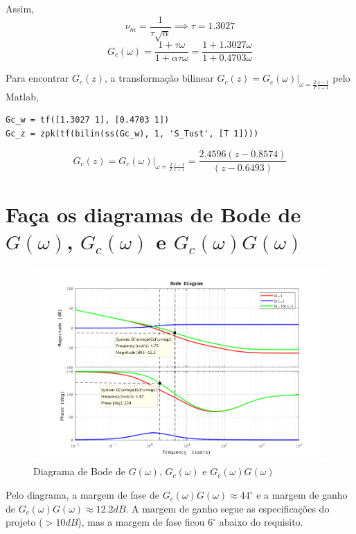 \documentclass{article}
\begin{document}
    {Assim,}
    $$ \nu_m = \frac{1}{\tau \sqrt{\alpha}} \implies \tau = 1.3027 $$
    $$ G_c(\omega) = \frac{1 + \tau\omega}{1 + \alpha\tau\omega} = \frac{1 + 1.3027\omega}{1 + 0.4703\omega} $$

    {Para encontrar $G_c(z)$, a transformação bilinear $G_c(z) = G_c(\omega)|_{\omega = \frac{2}{T}\frac{z-1}{z+1}}$ pelo Matlab,}
\begin{lstlisting}
Gc_w = tf([1.3027 1], [0.4703 1])
Gc_z = zpk(tf(bilin(ss(Gc_w), 1, 'S_Tust', [T 1])))
\end{lstlisting}
    $$ G_c(z) = G_c(\omega)|_{\omega = \frac{2}{T}\frac{z-1}{z+1}} = \frac{2.4596(z-0.8574)}{(z-0.6493)} $$


\section{\normalsize{Faça os diagramas de Bode de $G(\omega)$, $G_c(\omega)$ e $G_c(\omega)G(\omega)$}}
    \begin{figure}[H]
       \centering
            \includegraphics[width=1\linewidth]{images/bode_omega.png}
            \caption{Diagrama de Bode de $G(\omega)$, $G_c(\omega)$ e $G_c(\omega)G(\omega)$}
            \label{fig:bode_omega}
    \end{figure}

    {Pelo diagrama, a margem de fase de $G_c(\omega)G(\omega) \approx 44^\circ$ e a margem de ganho de $G_c(\omega)G(\omega) \approx 12.2 dB$. A margem de ganho segue as especificações do projeto ($> 10 dB$), mas a margem de fase ficou $6^\circ$ abaixo do requisito.}
\end{document}
